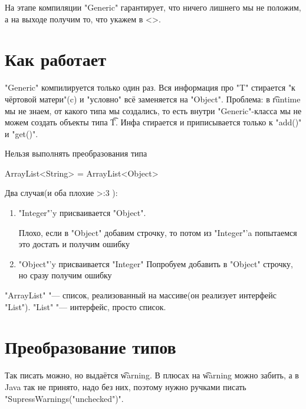 На этапе компиляции \java"Generic" гарантирует, что ничего лишнего мы не положим, а на выходе получим то, что укажем в <>.


\section{Как работает}
\java"Generic" компилируется только один раз.
Вся информация про \java"T" стирается "к чёртовой матери"(c) и "условно" всё заменяется на \java"Object". Проблема: в \t{runtime} мы не знаем,
от какого типа мы создались, то есть внутри \java"Generic"-класса мы не можем создать объекты типа \t{T}.
Инфа стирается и приписывается только к \java"add()" и \java"get()".


Нельзя выполнять преобразования типа
\begin{javacode}
ArrayList<String> = ArrayList<Object>
\end{javacode}
Два случая(и оба плохие >:3 ):
\begin{enumerate}
	\item
		\java"Integer"'y присваивается \java"Object".

		Плохо, если в \java"Object" добавим строчку, то потом из \java"Integer"'a попытаемся это достать и получим ошибку
	\item
		\java"Object"'y присваивается \java"Integer"
		Попробуем добавить в \java"Object" строчку, но сразу получим ошибку
\end{enumerate}

\java"ArrayList" "--- список, реализованный на массиве(он реализует интерфейс \java"List").
\java"List" "--- интерфейс, просто список.

\section{Преобразование типов}
Так писать можно, но выдаётся \t{warning}. В плюсах на \t{warning} можно забить, а в Java так не принято, надо без них, 
поэтому нужно ручками писать \java"SupressWarnings("unchecked")".

